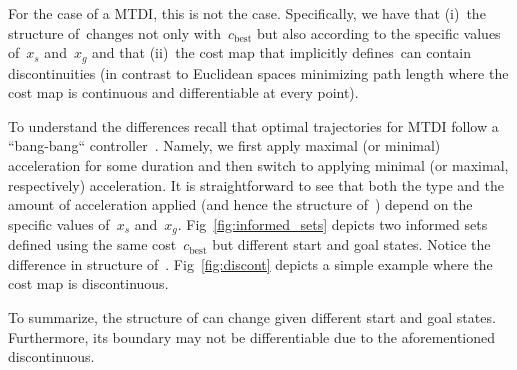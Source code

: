\documentclass[letterpaper, 10 pt, conference]{ieeeconf}  %
\begin{document}
For the case of a MTDI, this is not the case. 
Specifically, we have that 
(i)~the structure of~\Cinf changes not only with~$c_{\text{best}}$ but also according to the specific values of~$x_s$ and~$x_g$ 
and that
(ii)~the cost map that implicitly defines~\Cinf can contain discontinuities (in contrast to Euclidean spaces minimizing path length where the cost map is continuous and differentiable at every point).

To understand the differences recall that optimal trajectories  for MTDI follow a ``bang-bang`` controller~\cite{HN10, KS14}.
Namely, we first apply maximal (or minimal) acceleration for some duration and then switch to applying minimal (or maximal, respectively) acceleration.
It is straightforward to see that both the type and the amount of acceleration applied (and hence the structure of~\Cinf) depend on the specific values of~$x_s$ and~$x_g$. 
Fig~\ref{fig:informed_sets} 
depicts two informed sets defined using the same cost~$c_{\text{best}}$ but different start and goal states. Notice the difference in structure of~\Cinf. 
Fig~\ref{fig:discont} depicts a simple example where the cost map is discontinuous.

To summarize, the structure of \Cinf can change given different start and goal states.
Furthermore,  its boundary may not be  differentiable due to the aforementioned discontinuous. 
\end{document}
